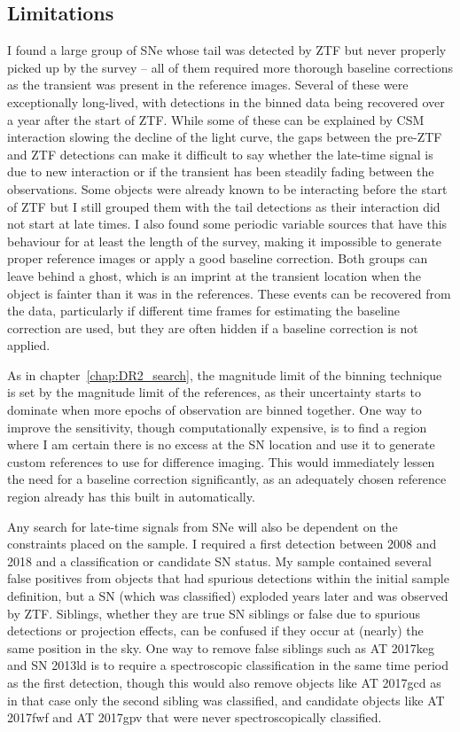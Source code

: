 \documentclass[a4paper,oneside,12pt, class=Latex/Classes/PhDthesisPSnPDF, crop=false]{standalone}
\begin{document}
\subsection{Limitations}
\label{sec:discussion:limitations}
I found a large group of SNe whose tail was detected by ZTF but never properly picked up by the survey -- all of them required more thorough baseline corrections as the transient was present in the reference images. Several of these were exceptionally long-lived, with detections in the binned data being recovered over a year after the start of ZTF. While some of these can be explained by CSM interaction slowing the decline of the light curve, the gaps between the pre-ZTF and ZTF detections can make it difficult to say whether the late-time signal is due to new interaction or if the transient has been steadily fading between the observations. Some objects were already known to be interacting before the start of ZTF but I still grouped them with the tail detections as their interaction did not start at late times. I also found some periodic variable sources that have this behaviour for at least the length of the survey, making it impossible to generate proper reference images or apply a good baseline correction. Both groups can leave behind a ghost, which is an imprint at the transient location when the object is fainter than it was in the references. These events can be recovered from the data, particularly if different time frames for estimating the baseline correction are used, but they are often hidden if a baseline correction is not applied.

As in chapter~\ref{chap:DR2_search}, the magnitude limit of the binning technique is set by the magnitude limit of the references, as their uncertainty starts to dominate when more epochs of observation are binned together. One way to improve the sensitivity, though computationally expensive, is to find a region where I am certain there is no excess at the SN location and use it to generate custom references to use for difference imaging. This would immediately lessen the need for a baseline correction significantly, as an adequately chosen reference region already has this built in automatically.

Any search for late-time signals from SNe will also be dependent on the constraints placed on the sample. I required a first detection between 2008 and 2018 and a classification or candidate SN status. My sample contained several false positives from objects that had spurious detections within the initial sample definition, but a SN (which was classified) exploded years later and was observed by ZTF. Siblings, whether they are true SN siblings or false due to spurious detections or projection effects, can be confused if they occur at (nearly) the same position in the sky. One way to remove false siblings such as AT 2017keg and SN 2013ld is to require a spectroscopic classification in the same time period as the first detection, though this would also remove objects like AT 2017gcd as in that case only the second sibling was classified, and candidate objects like AT 2017fwf and AT 2017gpv that were never spectroscopically classified.
\end{document}

